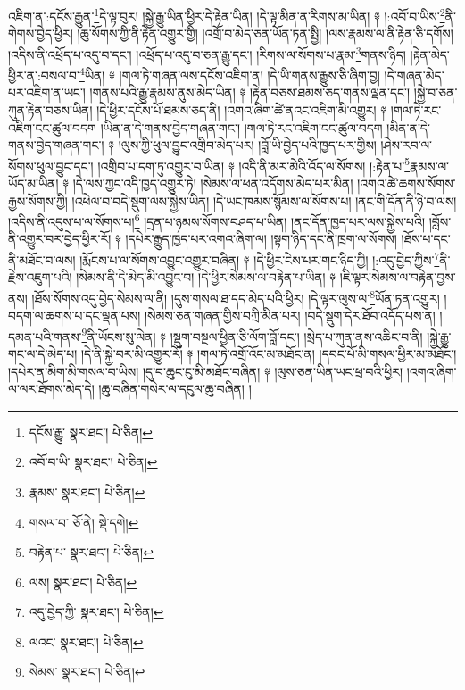འཇིག་ན་:དངོས་རྒྱུན་\footnote{དངོས་རྒྱུ་  སྣར་ཐང་།  པེ་ཅིན། }དེ་ལྟ་བུར། །སྐྱེ་རྒྱུ་ཡིན་ཕྱིར་དེ་རྟེན་ཡིན། །དེ་ལྟ་མིན་ན་རིགས་མ་ཡིན། ༈ །:འབོ་བ་ཡིས་\footnote{འབོ་བ་ཡི་  སྣར་ཐང་།  པེ་ཅིན། }ནི་གེགས་བྱེད་ཕྱིར། །ཆུ་སོགས་ཀྱི་ནི་རྟེན་འགྱུར་གྱི། །འགྲོ་བ་མེད་ཅན་ཡོན་ཏན་སྤྱི། །ལས་རྣམས་ལ་ནི་རྟེན་ཅི་དགོས། །འདིས་ནི་འཕྲོད་པ་འདུ་བ་དང་། །འཕྲོད་པ་འདུ་བ་ཅན་རྒྱུ་དང་། །རིགས་ལ་སོགས་པ་རྣམ་\footnote{རྣམས་  སྣར་ཐང་།  པེ་ཅིན། }གནས་ཉིད། །རྟེན་མེད་ཕྱིར་ན་:བསལ་བ་\footnote{གསལ་བ་  ཅོ་ནེ།  སྡེ་དགེ། }ཡིན། ༈ །གལ་ཏེ་གཞན་ལས་དངོས་འཇིག་ན། །དེ་ཡི་གནས་རྒྱུས་ཅི་ཞིག་བྱ། །དེ་གཞན་མེད་པར་འཇིག་ན་ཡང་། །གནས་པའི་རྒྱུ་རྣམས་ནུས་མེད་ཡིན། ༈ །རྟེན་བཅས་ཐམས་ཅད་གནས་ལྡན་དང་། །སྐྱེ་བ་ཅན་ཀུན་རྟེན་བཅས་ཡིན། །དེ་ཕྱིར་དངོས་པོ་ཐམས་ཅད་ནི། །འགའ་ཞིག་ཚེ་ནའང་འཇིག་མི་འགྱུར། ༈ །གལ་ཏེ་རང་འཇིག་ངང་ཚུལ་བདག །ཡིན་ན་དེ་གནས་བྱེད་གཞན་གང་། །གལ་ཏེ་རང་འཇིག་ངང་ཚུལ་བདག །མིན་ན་དེ་གནས་བྱེད་གཞན་གང་། ༈ །ལུས་ཀྱི་ཕུལ་བྱུང་འགྲིབ་མེད་པར། །བློ་ཡི་བྱེད་པའི་ཁྱད་པར་གྱིས། །ཤེས་རབ་ལ་སོགས་ཕུལ་བྱུང་དང་། །འགྲིབ་པ་དག་ཏུ་འགྱུར་བ་ཡིན། ༈ །འདི་ནི་མར་མེའི་འོད་ལ་སོགས། །:རྟེན་པ་\footnote{བརྟེན་པ་  སྣར་ཐང་།  པེ་ཅིན། }རྣམས་ལ་ཡོད་མ་ཡིན། ༈ །དེ་ལས་ཀྱང་འདི་ཁྱད་འགྱུར་ཏེ། །སེམས་ལ་ཕན་འདོགས་མེད་པར་མིན། །འགའ་ཚེ་ཆགས་སོགས་རྒྱས་སོགས་ཀྱི། །འཕེལ་བ་བདེ་སྡུག་ལས་སྐྱེས་ཡིན། །དེ་ཡང་ཁམས་སྙོམས་ལ་སོགས་པ། །ནང་གི་དོན་ནི་ཉེ་བ་ལས། །འདིས་ནི་འདུས་པ་ལ་སོགས་པ།\footnote{ལས།  སྣར་ཐང་།  པེ་ཅིན། } །དྲན་པ་ཉམས་སོགས་བཤད་པ་ཡིན། །ནང་དོན་ཁྱད་པར་ལས་སྐྱེས་པའི། །བློས་ནི་འགྱུར་བར་བྱེད་ཕྱིར་རོ། ༈ །དཔེར་རྒྱུད་ཁྱད་པར་འགའ་ཞིག་ལ། །སྟག་ཉིད་དང་ནི་ཁྲག་ལ་སོགས། །ཐོས་པ་དང་ནི་མཐོང་བ་ལས། །རྨོངས་པ་ལ་སོགས་འབྱུང་འགྱུར་བཞིན། ༈ །དེ་ཕྱིར་ངེས་པར་གང་ཉིད་ཀྱི། །:འདུ་བྱེད་ཀྱིས་\footnote{འདུ་བྱེད་ཀྱི་  སྣར་ཐང་།  པེ་ཅིན། }ནི་རྗེས་འཇུག་པའི། །སེམས་ནི་དེ་མེད་མི་འབྱུང་བ། །དེ་ཕྱིར་སེམས་ལ་བརྟེན་པ་ཡིན། ༈ །ཇི་ལྟར་སེམས་ལ་བརྟེན་བྱས་ནས། །ཐོས་སོགས་འདུ་བྱེད་སེམས་ལ་ནི། །དུས་གསལ་ཐ་དད་མེད་པའི་ཕྱིར། །དེ་ལྟར་ལུས་ལ་\footnote{ལའང་  སྣར་ཐང་།  པེ་ཅིན། }ཡོན་ཏན་འགྱུར། །བདག་ལ་ཆགས་པ་དང་ལྡན་པས། །སེམས་ཅན་གཞན་གྱིས་བཀྲི་མིན་པར། །བདེ་སྡུག་དེར་ཐོབ་འདོད་པས་ན། །དམན་པའི་གནས་\footnote{སེམས་  སྣར་ཐང་།  པེ་ཅིན། }ནི་ཡོངས་སུ་ལེན། ༈ །སྡུག་བསྔལ་ཕྱིན་ཅི་ལོག་བློ་དང་། །སྲེད་པ་ཀུན་ནས་འཆིང་བ་ནི། །སྐྱེ་རྒྱུ་གང་ལ་དེ་མེད་པ། །དེ་ནི་སྐྱེ་བར་མི་འགྱུར་རོ། ༈ །གལ་ཏེ་འགྲོ་འོང་མ་མཐོང་ན། །དབང་པོ་མི་གསལ་ཕྱིར་མ་མཐོང་། །དཔེར་ན་མིག་མི་གསལ་བ་ཡིས། །དུ་བ་ཆུང་ངུ་མི་མཐོང་བཞིན། ༈ །ལུས་ཅན་ཡིན་ཡང་ཕྲ་བའི་ཕྱིར། །འགའ་ཞིག་ལ་ལར་ཐོགས་མེད་དེ། །ཆུ་བཞིན་གསེར་ལ་དངུལ་ཆུ་བཞིན། །

